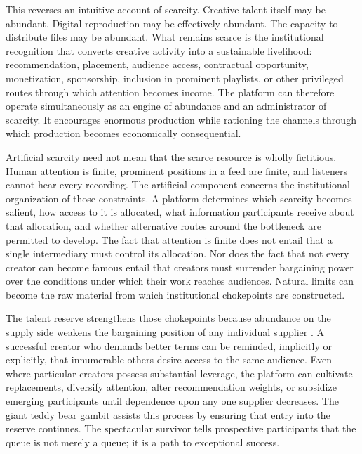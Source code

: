 \documentclass[11pt]{article}
\begin{document}
This reverses an intuitive account of scarcity. Creative talent itself may be abundant. Digital reproduction may be effectively abundant. The capacity to distribute files may be abundant. What remains scarce is the institutional recognition that converts creative activity into a sustainable livelihood: recommendation, placement, audience access, contractual opportunity, monetization, sponsorship, inclusion in prominent playlists, or other privileged routes through which attention becomes income. The platform can therefore operate simultaneously as an engine of abundance and an administrator of scarcity. It encourages enormous production while rationing the channels through which production becomes economically consequential.

Artificial scarcity need not mean that the scarce resource is wholly fictitious. Human attention is finite, prominent positions in a feed are finite, and listeners cannot hear every recording. The artificial component concerns the institutional organization of those constraints. A platform determines which scarcity becomes salient, how access to it is allocated, what information participants receive about that allocation, and whether alternative routes around the bottleneck are permitted to develop. The fact that attention is finite does not entail that a single intermediary must control its allocation. Nor does the fact that not every creator can become famous entail that creators must surrender bargaining power over the conditions under which their work reaches audiences. Natural limits can become the raw material from which institutional chokepoints are constructed.

The talent reserve strengthens those chokepoints because abundance on the supply side weakens the bargaining position of any individual supplier \citep{azarmarinescu2022monopsony,naidu2024monopsony}. A successful creator who demands better terms can be reminded, implicitly or explicitly, that innumerable others desire access to the same audience. Even where particular creators possess substantial leverage, the platform can cultivate replacements, diversify attention, alter recommendation weights, or subsidize emerging participants until dependence upon any one supplier decreases. The giant teddy bear gambit assists this process by ensuring that entry into the reserve continues. The spectacular survivor tells prospective participants that the queue is not merely a queue; it is a path to exceptional success.
\end{document}

